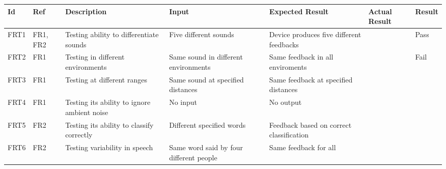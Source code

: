 \documentclass[12pt, titlepage]{article}
\begin{document}
\begin{longtable}{|p{1.2cm}|p{1cm}|p{2.3cm}|p{2cm}|p{2cm}|p{2cm}|p{1.2cm}|}
  \hline
  \textbf{Id} & \textbf{Ref} & \textbf{Description}                                                         & \textbf{Input}                                    & \textbf{Expected Result}                                    & \textbf{Actual Result} & \textbf{Result}                                    \\ \hline
  FRT1        & FR1, FR2     & Testing ability to differentiate sounds                                      & Five different sounds                             & Device produces five different feedbacks                    &                        & {\color[HTML]{32CB00} Pass}                        \\ \hline
  FRT2        & FR1          & Testing in different environments                                            & Same sound in different environments              & Same feedback in all enviroments                            &                        & {\color[HTML]{FE0000} Fail}                        \\ \hline
  FRT3        & FR1          & Testing at different ranges                                                  & Same sound at specified distances                 & Same feedback at specified distances                        &                        & \cellcolor[HTML]{FFFFFF}{\color[HTML]{F8A102} TBD} \\ \hline
  FRT4        & FR1          & Testing its ability to ignore ambient noise                                  & No input                                          & No output                                                   &                        &                                                    \\ \hline
  FRT5        & FR2          & Testing its ability to classify correctly                                    & Different specified words                         & Feedback based on correct classification                    &                        &                                                    \\ \hline
  FRT6        & FR2          & Testing variability in speech                                                & Same word said by four different people           & Same feedback for all                                       &                        &                                                    \\ \hline

\end{longtable}
\end{document}
